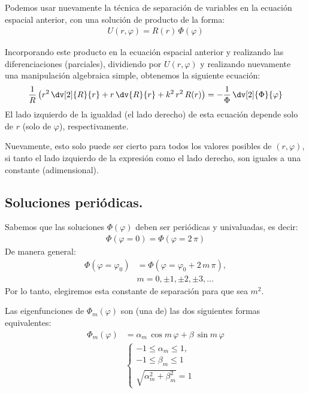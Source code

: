 Podemos usar nuevamente la técnica de separación de variables en la ecuación espacial anterior,  con una solución de producto de la forma:
\begin{align*}
U(r, \varphi) = R(r) \, \Phi (\varphi)
\end{align*}

Incorporando este producto en la ecuación espacial anterior y realizando las diferenciaciones (parciales),  dividiendo por $U(r, \varphi)$ y realizando nuevamente una manipulación algebraica simple,  obtenemos la siguiente ecuación:
\begin{align*}
\dfrac{1}{R} \left( r^{2} \, \dv[2]{R}{r} +  r \, \dv{R}{r} + k^{2} \, r^{2} \, R(r) \right) = - \dfrac{1}{\Phi} \, \dv[2]{\Phi}{\varphi}
\end{align*}
El lado izquierdo de la igualdad (el lado derecho) de esta ecuación depende solo de $r$ (solo de $\varphi$), respectivamente.
\par
Nuevamente, esto solo puede ser cierto para todos los valores posibles de $(r, \varphi)$, si tanto el lado izquierdo de la expresión como el lado derecho, son iguales a una constante (adimensional).


\subsection{Soluciones periódicas.}

Sabemos que las soluciones $\Phi(\varphi)$ deben ser periódicas y univaluadas, es decir:
\begin{align*}
\Phi (\varphi = 0) = \Phi (\varphi = 2 \, \pi)
\end{align*}
De manera general:
\begin{align*}
\Phi (\varphi = \varphi_{0}) &= \Phi (\varphi = \varphi_{0} + 2 \, m \, \pi), \\[0.em]
&m = 0, \pm 1, \pm 2,\pm 3, \ldots
\end{align*}
Por lo tanto, elegiremos esta constante de separación para que sea $m^{2}$.
\par
Las eigenfunciones de $\Phi_{m} (\varphi)$ son (una de) las dos siguientes formas equivalentes:
\begin{align*}
\Phi_{m} (\varphi) &= \alpha_{m} \, \cos m \, \varphi + \beta \, \sin m \, \varphi \\[1em]
&\begin{cases}
-1 \leq \alpha_{m} \leq 1, \\
-1 \leq \beta_{m} \leq 1 \\
\sqrt{\alpha_{m}^{2} + \beta_{m}^{2}} = 1
\end{cases}
\end{align*}

